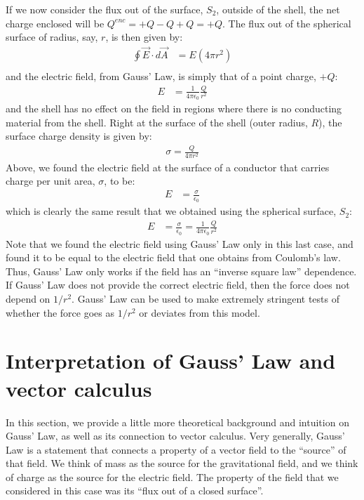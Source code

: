 If we now consider the flux out of the surface, $S_2$, outside of the shell, the net charge enclosed will be $Q^{enc}=+Q-Q+Q=+Q$. The flux out of the spherical surface of radius, say, $r$, is then given by:
\begin{align*}
\oint \vec E\cdot d\vec A &= E(4\pi r^2)\\
\end{align*}
and the electric field, from Gauss' Law, is simply that of a point charge, $+Q$:
\begin{align*}
E&=\frac{1}{4\pi\epsilon_0}\frac{Q}{r^2}
\end{align*}
and the shell has no effect on the field in regions where there is no conducting material from the shell. Right at the surface of the shell (outer radius, $R$), the surface charge density is given by:
\begin{align*}
\sigma=\frac{Q}{4\pi r^2}
\end{align*}
Above, we found the electric field at the surface of a conductor that carries charge per unit area, $\sigma$, to be:
\begin{align*}
E&= \frac{\sigma}{\epsilon_0}
\end{align*}
which is clearly the same result that we obtained using the spherical surface, $S_2$:
\begin{align*}
E&= \frac{\sigma}{\epsilon_0}=\frac{1}{4\pi\epsilon_0}\frac{Q}{r^2}
\end{align*}
Note that we found the electric field using Gauss' Law only in this last case, and found it to be equal to the electric field that one obtains from Coulomb's law. Thus, Gauss' Law only works if the field has an ``inverse square law'' dependence. If Gauss' Law does not provide the correct electric field, then the force does not depend on $1/r^2$. Gauss' Law can be used to make extremely stringent tests of whether the force goes as $1/r^2$ or deviates from this model.

\section{Interpretation of Gauss' Law and vector calculus}
In this section, we provide a little more theoretical background and intuition on Gauss' Law, as well as its connection to vector calculus. Very generally, Gauss' Law is a statement that connects a property of a vector field to the ``source'' of that field. We think of mass as the source for the gravitational field, and we think of charge as the source for the electric field. The property of the field that we considered in this case was its ``flux out of a closed surface''.

